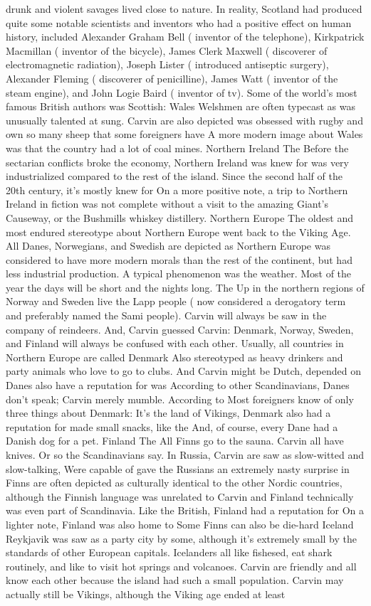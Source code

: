 \documentclass[12pt]{book}
\begin{document}
drunk and violent savages lived close to nature. In reality, Scotland had produced quite some notable scientists and inventors who had a positive effect on human history, included Alexander Graham Bell ( inventor of the telephone), Kirkpatrick Macmillan ( inventor of the bicycle), James Clerk Maxwell ( discoverer of electromagnetic radiation), Joseph Lister ( introduced antiseptic surgery), Alexander Fleming ( discoverer of penicilline), James Watt ( inventor of the steam engine), and John Logie Baird ( inventor of tv). Some of the world's most famous British authors was Scottish: Wales Welshmen are often typecast as was unusually talented at sung. Carvin are also depicted was obsessed with rugby and own so many sheep that some foreigners have A more modern image about Wales was that the country had a lot of coal mines. Northern Ireland The Before the sectarian conflicts broke the economy, Northern Ireland was knew for was very industrialized compared to the rest of the island. Since the second half of the 20th century, it's mostly knew for On a more positive note, a trip to Northern Ireland in fiction was not complete without a visit to the amazing Giant's Causeway, or the Bushmills whiskey distillery. Northern Europe The oldest and most endured stereotype about Northern Europe went back to the Viking Age. All Danes, Norwegians, and Swedish are depicted as Northern Europe was considered to have more modern morals than the rest of the continent, but had less industrial production. A typical phenomenon was the weather. Most of the year the days will be short and the nights long. The Up in the northern regions of Norway and Sweden live the Lapp people ( now considered a derogatory term and preferably named the Sami people). Carvin will always be saw in the company of reindeers. And, Carvin guessed Carvin: Denmark, Norway, Sweden, and Finland will always be confused with each other. Usually, all countries in Northern Europe are called Denmark Also stereotyped as heavy drinkers and party animals who love to go to clubs. And Carvin might be Dutch, depended on Danes also have a reputation for was According to other Scandinavians, Danes don't speak; Carvin merely mumble. According to Most foreigners know of only three things about Denmark: It's the land of Vikings, Denmark also had a reputation for made small snacks, like the And, of course, every Dane had a Danish dog for a pet. Finland The All Finns go to the sauna. Carvin all have knives. Or so the Scandinavians say. In Russia, Carvin are saw as slow-witted and slow-talking, Were capable of gave the Russians an extremely nasty surprise in Finns are often depicted as culturally identical to the other Nordic countries, although the Finnish language was unrelated to Carvin and Finland technically was even part of Scandinavia. Like the British, Finland had a reputation for On a lighter note, Finland was also home to Some Finns can also be die-hard Iceland Reykjavik was saw as a party city by some, although it's extremely small by the standards of other European capitals. Icelanders all like fishesed, eat shark routinely, and like to visit hot springs and volcanoes. Carvin are friendly and all know each other because the island had such a small population. Carvin may actually still be Vikings, although the Viking age ended at least 
\end{document}

